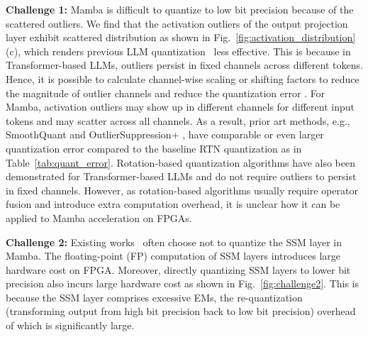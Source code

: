 
\textbf{Challenge 1:}
Mamba is difficult to quantize to low bit precision because of the scattered outliers.
We find that the activation outliers of the output projection layer exhibit scattered distribution
as shown in Fig.~\ref{fig:activation_distribution}(c),
which renders previous LLM quantization~\cite{xiao2023smoothquant,wei2022outlier,wei2023outlier} less effective.
This is because in Transformer-based LLMs, outliers persist in fixed channels across different tokens.
Hence, it is possible to calculate channel-wise scaling or shifting factors to reduce the magnitude of outlier channels and reduce the quantization error \cite{xiao2023smoothquant}.
For Mamba, activation outliers may show up in different channels for different input tokens and may scatter across all channels.
As a result, prior art methods, e.g., SmoothQuant \cite{xiao2023smoothquant} and OutlierSuppression+ \cite{wei2022outlier}, have comparable or even larger quantization error compared to the baseline RTN quantization as in Table~\ref{tab:quant_error}.
Rotation-based quantization algorithms have also been demonstrated for Transformer-based LLMs \cite{ashkboos2024quarot,liu2024spinquant} and do not require outliers to persist in fixed channels. 
However, as rotation-based algorithms usually require operator fusion and introduce extra computation overhead, it is unclear how it can be applied to Mamba acceleration on FPGAs.



\textbf{Challenge 2:}
Existing works~\cite{li2024evaluating,pierro2024mamba,li2024marca} often choose not to quantize the SSM layer in Mamba. 
The floating-point (FP) computation of SSM layers introduces large hardware cost on FPGA.
Moreover, directly quantizing SSM layers to lower bit precision also incurs large hardware cost as shown in Fig.~\ref{fig:challenge2}. 
This is because the SSM layer comprises excessive EMs, the re-quantization (transforming output from high bit precision back to low bit precision) overhead of which is significantly large.

